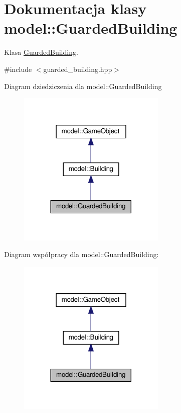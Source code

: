 \hypertarget{classmodel_1_1GuardedBuilding}{}\section{Dokumentacja klasy model\+:\+:Guarded\+Building}
\label{classmodel_1_1GuardedBuilding}


Klasa \hyperlink{classmodel_1_1GuardedBuilding}{Guarded\+Building}.  




{\ttfamily \#include $<$guarded\+\_\+building.\+hpp$>$}



Diagram dziedziczenia dla model\+:\+:Guarded\+Building\nopagebreak
\begin{figure}[H]
\begin{center}
\leavevmode
\includegraphics[width=200pt]{classmodel_1_1GuardedBuilding__inherit__graph}
\end{center}
\end{figure}


Diagram współpracy dla model\+:\+:Guarded\+Building\+:\nopagebreak
\begin{figure}[H]
\begin{center}
\leavevmode
\includegraphics[width=200pt]{classmodel_1_1GuardedBuilding__coll__graph}
\end{center}
\end{figure}
